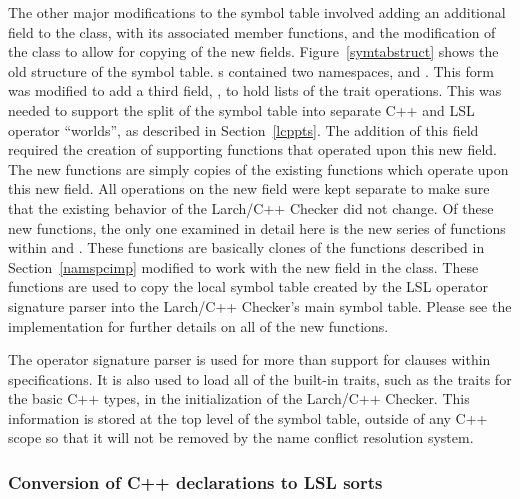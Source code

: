 The other major modifications to the symbol table involved adding an
additional field to the  class, with its associated
member functions, and the modification of the  class
to allow for copying of the new fields. Figure~\ref{symtabstruct}
shows the old structure of the symbol table. s
contained two namespaces,  and
. This form was modified to add a third field,
, to hold lists of the trait operations. This was
needed to support the split of the symbol table into separate C++ and
LSL operator ``worlds'', as described in Section~\ref{lcppts}. The
addition of this field required the creation of supporting functions
that operated upon this new field. The new functions are simply copies
of the existing  functions which operate upon this
new field. All operations on the new field were kept separate to make
sure that the existing behavior of the Larch/C++ Checker did not
change. Of these new functions, the only one examined in detail here
is the new  series of functions within
 and
. These functions are basically clones of the
 functions described in Section~\ref{namspcimp} modified
to work with the new  field in the
 class. These functions are used to copy the local
symbol table created by the LSL operator signature parser into the
Larch/C++ Checker's main symbol table. Please see the implementation
for further details on all of the new functions.

The operator signature parser is used for more than support for
 clauses within specifications. It is also used to load
all of the built-in traits, such as the traits for the basic C++
types, in the initialization of the Larch/C++ Checker. This
information is stored at the top level of the symbol table, outside of
any C++ scope so that it will not be removed by the name conflict
resolution system.

\subsubsection{Conversion of C++ declarations to LSL sorts}

